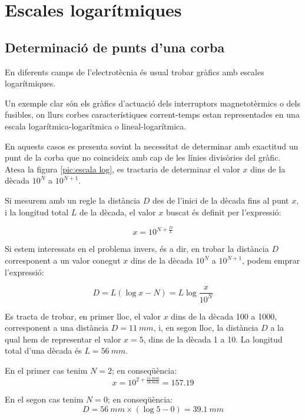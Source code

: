 \section{Escales logarítmiques}\label{sec:escales-log} 

\subsection{Determinació de punts d'una corba}

En diferents camps de l'electrotècnia és usual trobar gràfics amb escales
logarítmiques.

Un exemple clar són els gràfics d'actuació dels interruptors magnetotèrmics o dels
fusibles, on llurs corbes característiques corrent-temps estan representades en
una escala logarítmica-logarítmica o lineal-logarítmica.

En aquests casos es presenta sovint la necessitat de determinar amb exactitud un
punt de la corba que no coincideix amb cap de les línies divisòries del gràfic. Atesa
la figura \vref{pic:escala log}, es tractaria de determinar el valor $x$ dins de la dècada
$10^N$ a $10^{N+1}$.

\begin{center}
    
    \label{pic:escala log}
\end{center}

Si mesurem amb un regle la distància $D$ des de l'inici de la dècada fins al punt $x$, i
la longitud total $L$ de la dècada, el valor $x$ buscat és definit per l'expressió:

\begin{equation}
    x = 10^{N+\frac{D}{L}}
\end{equation}

Si estem interessats en el problema invers, és a dir, en  trobar la distància $D$
corresponent a un valor conegut $x$ dins de la dècada $10^N$ a $10^{N+1}$, podem emprar
l'expressió:

\begin{equation}
    D = L(\log x - N) = L \log\frac{x}{10^N}
\end{equation}

	
\begin{exemple}[\ValorsEscalaLog{}]
	\addcontentsxms{\ValorsEscalaLog}
    Es tracta de trobar, en primer lloc, el valor $x$ dins de la dècada 100 a 1000, corresponent a una
    distància $D=\qty{11}{mm}$, i, en segon lloc, la distància $D$ a la qual hem de representar el valor $x=5$, dins de la
    dècada 1 a 10. La longitud total d'una dècada és $L=\qty{56}{mm}$.

    En el primer cas tenim $N=2$; en conseqüència:
    \[
        x = 10^{2+\frac{\qty{11}{mm}}{\qty{56}{mm}}}= \num{157,19}
    \]

    En el segon cas tenim $N=0$; en conseqüència:
    \[
        D = \qty{56}{mm} \times (\log 5 - 0)  = \qty{39,1}{mm}
    \]

\end{exemple}

